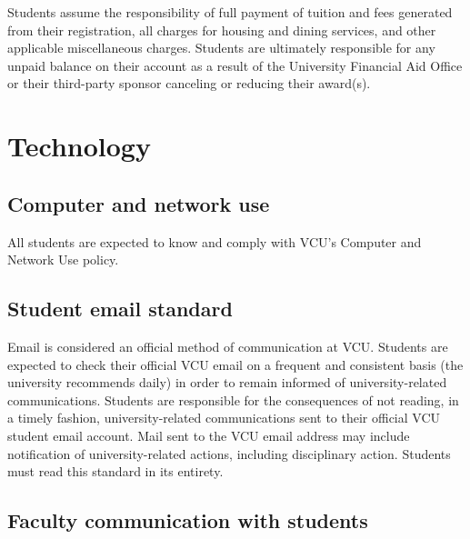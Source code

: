 \documentclass[
  letterpaper,
]{book}
\begin{document}
Students assume the responsibility of full payment of tuition and fees
generated from their registration, all charges for housing and dining
services, and other applicable miscellaneous charges. Students are
ultimately responsible for any unpaid balance on their account as a
result of the University Financial Aid Office or their third-party
sponsor canceling or reducing their award(s).

\section*{Technology}\label{technology}


\subsection*{Computer and network use}\label{computer-and-network-use}

All students are expected to know and comply with VCU's Computer and
Network Use policy.

\subsection*{Student email standard}\label{student-email-standard}

Email is considered an official method of communication at VCU. Students
are expected to check their official VCU email on a frequent and
consistent basis (the university recommends daily) in order to remain
informed of university-related communications. Students are responsible
for the consequences of not reading, in a timely fashion,
university-related communications sent to their official VCU student
email account. Mail sent to the VCU email address may include
notification of university-related actions, including disciplinary
action. Students must read this standard in its entirety.

\subsection*{Faculty communication with
students}\label{faculty-communication-with-students}
\end{document}
